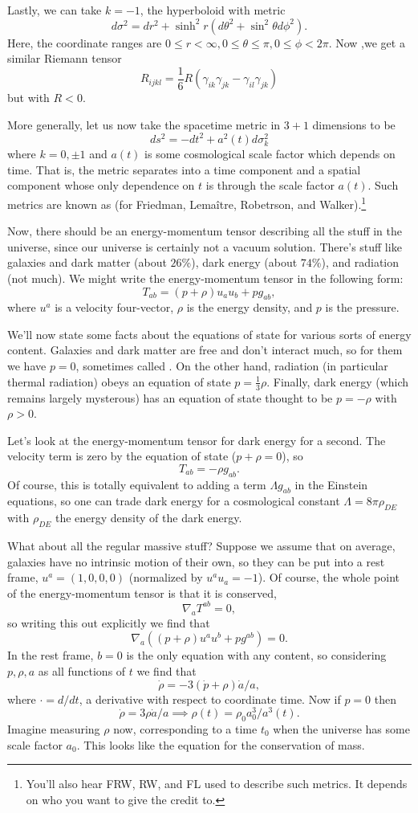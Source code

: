 Lastly, we can take $k=-1$, the hyperboloid with metric $$d\sigma^2=dr^2+\sinh^2 r (d\theta^2 +\sin^2\theta d\phi^2).$$
Here, the coordinate ranges are $0\leq r < \infty, 0\leq \theta \leq \pi, 0\leq \phi < 2\pi.$ Now ,we get a similar Riemann tensor
$$R_{ijkl}=\frac{1}{6}R(\gamma_{ik}\gamma_{jk}-\gamma_{il}\gamma_{jk})$$
but with $R<0.$

\begin{defn}
More generally, let us now take the spacetime metric in $3+1$ dimensions to be
$$ds^2=-dt^2+a^2(t) d\sigma_k^2$$
where $k=0,\pm 1$ and $a(t)$ is some cosmological scale factor which depends on time. That is, the metric separates into a time component and a spatial component whose only dependence on $t$ is through the scale factor $a(t)$. Such metrics are known as  (for Friedman, Lema\^itre, Robetrson, and Walker).\footnote{You'll also hear FRW, RW, and FL used to describe such metrics. It depends on who you want to give the credit to.}
\end{defn}

Now, there should be an energy-momentum tensor describing all the stuff in the universe, since our universe is certainly not a vacuum solution. There's stuff like galaxies and dark matter (about $26$\%), dark energy (about $74$\%), and radiation (not much). We might write the energy-momentum tensor in the following form:
$$T_{ab}=(p+\rho)u_a u_b +p g_{ab},$$
where $u^a$ is a velocity four-vector, $\rho$ is the energy density, and $p$ is the pressure.

We'll now state some facts about the equations of state for various sorts of energy content. Galaxies and dark matter are free and don't interact much, so for them we have $p=0$, sometimes called . On the other hand, radiation (in particular thermal radiation) obeys an equation of state $p=\frac{1}{3}\rho$. Finally, dark energy (which remains largely mysterous) has an equation of state thought to be $p=-\rho$ with $\rho>0$.

Let's look at the energy-momentum tensor for dark energy for a second. The velocity term is zero by the equation of state ($p+\rho=0$), so
$$T_{ab}=-\rho g_{ab}.$$
Of course, this is totally equivalent to adding a term $\Lambda g_{ab}$ in the Einstein equations, so one can trade dark energy for a cosmological constant $\Lambda=8\pi \rho_{DE}$ with $\rho_{DE}$ the energy density of the dark energy.

What about all the regular massive stuff? Suppose we assume that on average, galaxies have no intrinsic motion of their own, so they can be put into a rest frame, $u^a=(1,0,0,0)$ (normalized by $u^a u_a=-1$). Of course, the whole point of the energy-momentum tensor is that it is conserved,
$$\nabla_a T^{ab}=0,$$
so writing this out explicitly we find that
$$\nabla_a((p+\rho)u^a u^b + p g^{ab})=0.$$
In the rest frame, $b=0$ is the only equation with any content, so considering $p,\rho,a$ as all functions of $t$ we find that
$$\dot \rho=-3(\dot p+\rho)\dot a/a,$$
where $\cdot=d/dt$, a derivative with respect to coordinate time. Now if $p=0$ then
$$\dot \rho =3\rho \dot a/a \implies \rho(t)=\rho_0 a_0^3/a^3(t).$$
Imagine measuring $\rho$ now, corresponding to a time $t_0$ when the universe has some scale factor $a_0$. This looks like the equation for the conservation of mass.
